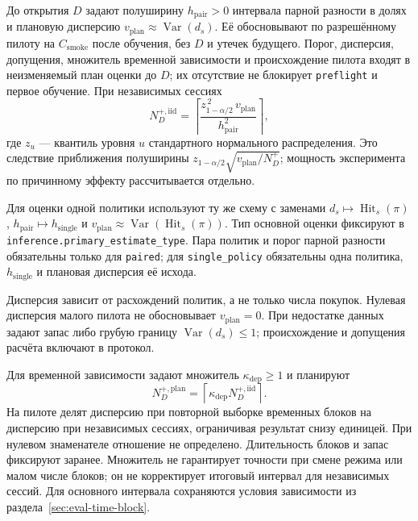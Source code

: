 \documentclass[12pt,a4paper]{article}
\newcommand{\code}[1]{{\ttfamily\small\nolinkurl{#1}}}
\DeclareMathOperator{\Var}{Var}
\theoremstyle{plainru}
\begin{document}
До открытия $D$ задают полуширину $h_{\mathrm{pair}}>0$ интервала парной
разности в долях и плановую дисперсию
$v_{\mathrm{plan}}\approx\Var(d_s)$. Её обосновывают по разрешённому
пилоту на $C_{\mathrm{smoke}}$ после обучения, без $D$ и утечек будущего.
Порог, дисперсия, допущения, множитель временной зависимости и происхождение
пилота входят в неизменяемый план оценки до $D$; их отсутствие не блокирует
\code{preflight} и первое обучение. При независимых сессиях
\begin{equation}\label{eq:eval-precision-size}
 N_D^{+,\mathrm{iid}}=
 \left\lceil
 \frac{z_{1-\alpha/2}^{\,2}\,v_{\mathrm{plan}}}
      {h_{\mathrm{pair}}^2}
 \right\rceil,
\end{equation}
где $z_u$ --- квантиль уровня $u$ стандартного нормального распределения.
Это следствие приближения полуширины
$z_{1-\alpha/2}\sqrt{v_{\mathrm{plan}}/N_D^+}$; мощность эксперимента
по причинному эффекту рассчитывается отдельно.

Для оценки одной политики используют ту же схему с заменами
$d_s\mapsto\operatorname{Hit}_s(\pi)$,
$h_{\mathrm{pair}}\mapsto h_{\mathrm{single}}$ и
$v_{\mathrm{plan}}\approx\Var(\operatorname{Hit}_s(\pi))$.
Тип основной оценки фиксируют в \code{inference.primary_estimate_type}.
Пара политик и порог парной разности обязательны только для
\code{paired}; для \code{single_policy} обязательны одна политика,
$h_{\mathrm{single}}$ и плановая дисперсия её исхода.

Дисперсия зависит от расхождений политик, а не только числа покупок.
Нулевая дисперсия малого пилота не обосновывает $v_{\mathrm{plan}}=0$.
При недостатке данных задают запас либо грубую границу $\Var(d_s)\le1$;
происхождение и допущения расчёта включают в протокол.

Для временной зависимости задают множитель
$\kappa_{\mathrm{dep}}\ge1$ и планируют
\begin{equation}\label{eq:eval-precision-dependent}
 N_D^{+,\mathrm{plan}}=
 \left\lceil\kappa_{\mathrm{dep}}N_D^{+,\mathrm{iid}}\right\rceil.
\end{equation}
На пилоте делят дисперсию при повторной выборке временных блоков
на дисперсию при независимых сессиях, ограничивая результат снизу единицей.
При нулевом знаменателе отношение не определено. Длительность блоков
и запас фиксируют заранее. Множитель не гарантирует точности при смене
режима или малом числе блоков; он не корректирует итоговый интервал
для независимых сессий.
Для основного интервала сохраняются условия зависимости
из раздела~\ref{sec:eval-time-block}.
\end{document}
